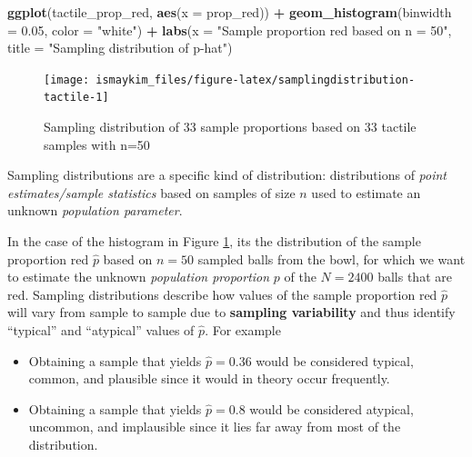 \documentclass[12pt,]{krantz}
\makeatletter
\newenvironment{Shaded}{\begin{snugshade}}{\end{snugshade}}
\newcommand{\KeywordTok}[1]{\textcolor[rgb]{0.27,0.27,0.27}{\textbf{#1}}}
\newcommand{\DataTypeTok}[1]{\textcolor[rgb]{0.27,0.27,0.27}{#1}}
\newcommand{\FloatTok}[1]{\textcolor[rgb]{0.06,0.06,0.06}{#1}}
\newcommand{\StringTok}[1]{\textcolor[rgb]{0.5,0.5,0.5}{#1}}
\newcommand{\OperatorTok}[1]{\textcolor[rgb]{0.43,0.43,0.43}{\textbf{#1}}}
\newcommand{\NormalTok}[1]{#1}
\providecommand{\tightlist}{%
  \setlength{\itemsep}{0pt}\setlength{\parskip}{0pt}}
\newenvironment{kframe}{%
\medskip{}
\setlength{\fboxsep}{.8em}
 \def\at@end@of@kframe{}%
 \ifinner\ifhmode%
  \def\at@end@of@kframe{\end{minipage}}%
  \begin{minipage}{\columnwidth}%
 \fi\fi%
 \def\FrameCommand##1{\hskip\@totalleftmargin \hskip-\fboxsep
 \colorbox{shadecolor}{##1}\hskip-\fboxsep
     \hskip-\linewidth \hskip-\@totalleftmargin \hskip\columnwidth}%
 \MakeFramed {\advance\hsize-\width
   \@totalleftmargin\z@ \linewidth\hsize
   \@setminipage}}%
 {\par\unskip\endMakeFramed%
 \at@end@of@kframe}
\renewenvironment{Shaded}{\begin{kframe}}{\end{kframe}}
\makeatother
\begin{document}
\begin{Shaded}
\begin{Highlighting}[]
\KeywordTok{ggplot}\NormalTok{(tactile_prop_red, }\KeywordTok{aes}\NormalTok{(}\DataTypeTok{x =}\NormalTok{ prop_red)) }\OperatorTok{+}
\StringTok{  }\KeywordTok{geom_histogram}\NormalTok{(}\DataTypeTok{binwidth =} \FloatTok{0.05}\NormalTok{, }\DataTypeTok{color =} \StringTok{"white"}\NormalTok{) }\OperatorTok{+}
\StringTok{  }\KeywordTok{labs}\NormalTok{(}\DataTypeTok{x =} \StringTok{"Sample proportion red based on n = 50"}\NormalTok{, }
       \DataTypeTok{title =} \StringTok{"Sampling distribution of p-hat"}\NormalTok{) }
\end{Highlighting}
\end{Shaded}

\begin{figure}

{\centering \texttt{[image: ismaykim\_files/figure-latex/samplingdistribution-tactile-1]} 

}

\caption{Sampling distribution of 33 sample proportions based on 33 tactile samples with n=50}\label{fig:samplingdistribution-tactile}
\end{figure}

Sampling distributions are a specific kind of distribution:
distributions of \emph{point estimates/sample statistics} based on
samples of size \(n\) used to estimate an unknown \emph{population
parameter}.

In the case of the histogram in Figure
\ref{fig:samplingdistribution-tactile}, its the distribution of the
sample proportion red \(\widehat{p}\) based on \(n=50\) sampled balls
from the bowl, for which we want to estimate the unknown
\emph{population proportion} \(p\) of the \(N=2400\) balls that are red.
Sampling distributions describe how values of the sample proportion red
\(\widehat{p}\) will vary from sample to sample due to \textbf{sampling
variability} and thus identify ``typical'' and ``atypical'' values of
\(\widehat{p}\). For example

\begin{itemize}
\tightlist
\item
  Obtaining a sample that yields \(\widehat{p} = 0.36\) would be
  considered typical, common, and plausible since it would in theory
  occur frequently.
\item
  Obtaining a sample that yields \(\widehat{p} = 0.8\) would be
  considered atypical, uncommon, and implausible since it lies far away
  from most of the distribution.
\end{itemize}
\end{document}
